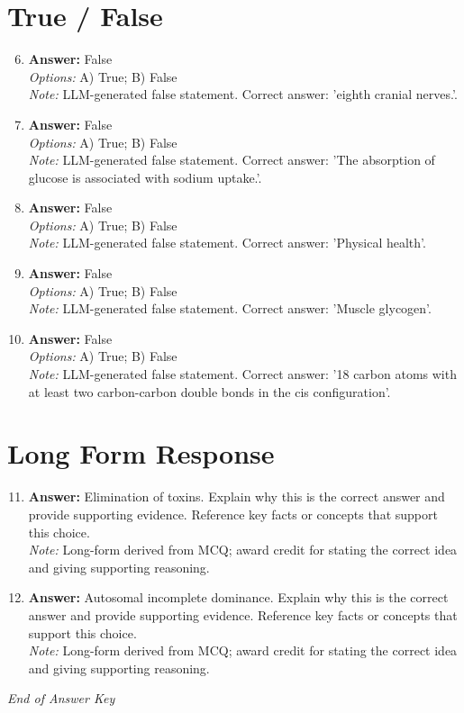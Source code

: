 \documentclass[12pt]{article}
\begin{document}
\section*{True / False}
\begin{enumerate}[label=\arabic*.]
\setcounter{enumi}{5}
\item \textbf{Answer:} False
\\ \textit{Options:} A) True; B) False
\\ \textit{Note:} LLM-generated false statement. Correct answer: 'eighth cranial nerves.'.
\item \textbf{Answer:} False
\\ \textit{Options:} A) True; B) False
\\ \textit{Note:} LLM-generated false statement. Correct answer: 'The absorption of glucose is associated with sodium uptake.'.
\item \textbf{Answer:} False
\\ \textit{Options:} A) True; B) False
\\ \textit{Note:} LLM-generated false statement. Correct answer: 'Physical health'.
\item \textbf{Answer:} False
\\ \textit{Options:} A) True; B) False
\\ \textit{Note:} LLM-generated false statement. Correct answer: 'Muscle glycogen'.
\item \textbf{Answer:} False
\\ \textit{Options:} A) True; B) False
\\ \textit{Note:} LLM-generated false statement. Correct answer: '18 carbon atoms with at least two carbon-carbon double bonds in the cis configuration'.
\end{enumerate}

\section*{Long Form Response}
\begin{enumerate}[label=\arabic*.]
\setcounter{enumi}{10}
\item \textbf{Answer:} Elimination of toxins. Explain why this is the correct answer and provide supporting evidence. Reference key facts or concepts that support this choice.
\\ \textit{Note:} Long-form derived from MCQ; award credit for stating the correct idea and giving supporting reasoning.
\item \textbf{Answer:} Autosomal incomplete dominance. Explain why this is the correct answer and provide supporting evidence. Reference key facts or concepts that support this choice.
\\ \textit{Note:} Long-form derived from MCQ; award credit for stating the correct idea and giving supporting reasoning.
\end{enumerate}

\vfill
\noindent\textit{End of Answer Key}
\end{document}
